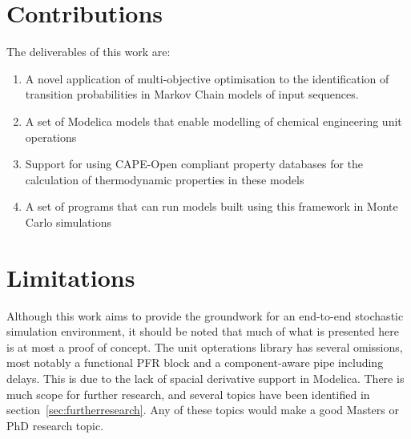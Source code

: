 \section{Contributions}
The deliverables of this work are:
\begin{enumerate}
\item A novel application of multi-objective optimisation to the identification of transition probabilities in Markov Chain models of input sequences.
\item A set of Modelica models that enable modelling of chemical engineering unit operations
\item Support for using CAPE-Open compliant property databases for the calculation of thermodynamic properties in these models
\item A set of programs that can run models built using this framework in Monte Carlo simulations
\end{enumerate}

\section{Limitations}
Although this work aims to provide the groundwork for an end-to-end stochastic simulation environment, it should be noted that much of what is presented here is at most a proof of concept.
The unit opterations library has several omissions, most notably a functional PFR block and a component-aware pipe including delays.  
This is due to the lack of spacial derivative support in Modelica.
There is much scope for further research, and several topics have been identified in section~\ref{sec:furtherresearch}.
Any of these topics would make a good Masters or PhD research topic.

